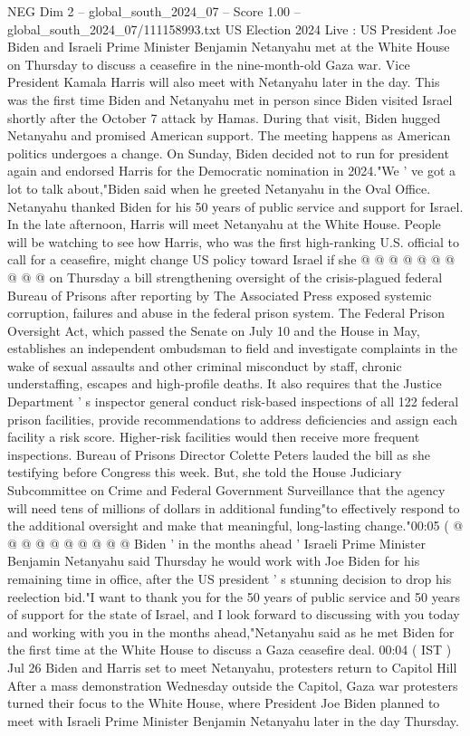 \begin{textsample}{NEG Dim 2 – global\_south\_2024\_07 – Score 1.00 – global\_south\_2024\_07/111158993.txt}  \label{ex:f2_neg_287}
US Election 2024 Live : US President Joe Biden and Israeli Prime Minister Benjamin Netanyahu met at the White House on Thursday to discuss a ceasefire in the nine-month-old Gaza war.
Vice President Kamala Harris will also meet with Netanyahu later in the day.
This was the first time Biden and Netanyahu met in person since Biden visited Israel shortly after the October 7 attack by Hamas.
During that visit, Biden hugged Netanyahu and promised American support.
The meeting happens as American politics undergoes a change.
On Sunday, Biden decided not to run for president again and endorsed Harris for the Democratic nomination in 2024."We ' ve got a lot to talk about,"Biden said when he greeted Netanyahu in the Oval Office.
Netanyahu thanked Biden for his 50 years of public service and support for Israel.
In the late afternoon, Harris will meet Netanyahu at the White House.
People will be watching to see how Harris, who was the first high-ranking U.S. official to call for a ceasefire, might change US policy toward Israel if she @ @ @ @ @ @ @ @ @ @ on Thursday a bill strengthening oversight of the crisis-plagued federal Bureau of Prisons after reporting by The Associated Press exposed systemic corruption, failures and abuse in the federal prison system.
The Federal Prison Oversight Act, which passed the Senate on July 10 and the House in May, establishes an independent ombudsman to field and investigate complaints in the wake of sexual assaults and other criminal misconduct by staff, chronic understaffing, escapes and high-profile deaths.
It also requires that the Justice Department ' s inspector general conduct risk-based inspections of all 122 federal prison facilities, provide recommendations to address deficiencies and assign each facility a risk score.
Higher-risk facilities would then receive more frequent inspections.
Bureau of Prisons Director Colette Peters lauded the bill as she testifying before Congress this week.
But, she told the House Judiciary Subcommittee on Crime and Federal Government Surveillance that the agency will need tens of millions of dollars in additional funding"to effectively respond to the additional oversight and make that meaningful, long-lasting change."00:05 ( @ @ @ @ @ @ @ @ @ @ Biden ' in the months ahead ' Israeli Prime Minister Benjamin Netanyahu said Thursday he would work with Joe Biden for his remaining time in office, after the US president ' s stunning decision to drop his reelection bid."I want to thank you for the 50 years of public service and 50 years of support for the state of Israel, and I look forward to discussing with you today and working with you in the months ahead,"Netanyahu said as he met Biden for the first time at the White House to discuss a Gaza ceasefire deal. 00:04 ( IST ) Jul 26 Biden and Harris set to meet Netanyahu, protesters return to Capitol Hill After a mass demonstration Wednesday outside the Capitol, Gaza war protesters turned their focus to the White House, where President Joe Biden planned to meet with Israeli Prime Minister Benjamin Netanyahu later in the day Thursday.

\end{textsample}
